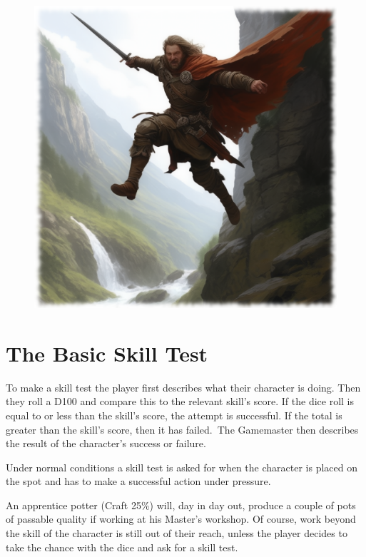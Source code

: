 \begin{figure}[h]
\begin{center}
\includegraphics[scale=0.23]{img/ai-images/warrior-jumping.png}
\end{center}
\end{figure}

\section{The Basic Skill Test}
To make a skill test the player first describes what their character is doing. Then they roll a D100 and compare this to the relevant skill’s score. If the dice roll is equal to or less than the skill’s score, the attempt is successful. If the total is greater than the skill’s score, then it has failed. The Gamemaster then describes the result of the character’s success or failure.

Under normal conditions a skill test is asked for when the character is placed on the spot and has to make a successful action under pressure. 

\begin{rpg-examplebox}
An apprentice potter (Craft 25\%) will, day in day out, produce a couple of pots of passable quality if working at his Master’s workshop. Of course, work beyond the skill of the character is still out of their reach, unless the player decides to take the chance with the dice and ask for a skill test.
\end{rpg-examplebox}

